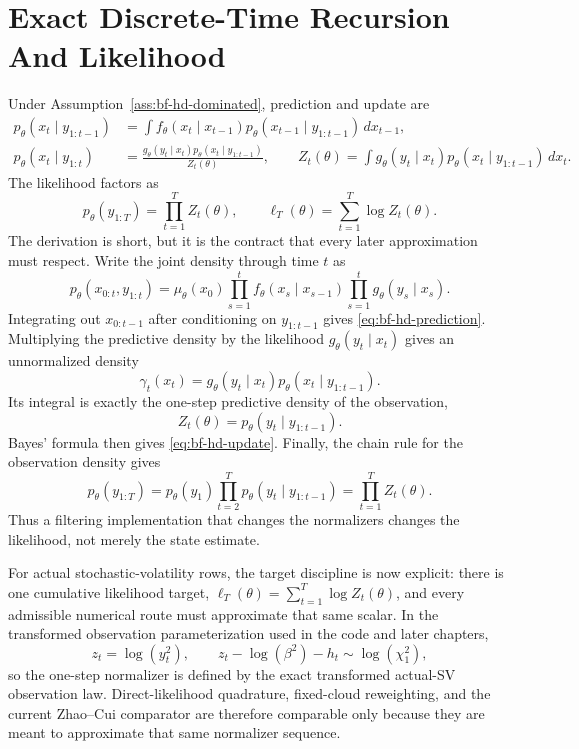 \section{Exact Discrete-Time Recursion And Likelihood}
\label{sec:bf-hd-exact-recursion}

Under Assumption~\ref{ass:bf-hd-dominated}, prediction and update are
\begin{align}
  p_\theta(x_t\mid y_{1:t-1})
    &= \int f_\theta(x_t\mid x_{t-1})
       p_\theta(x_{t-1}\mid y_{1:t-1})\,dx_{t-1},
       \label{eq:bf-hd-prediction}\\
  p_\theta(x_t\mid y_{1:t})
    &= \frac{g_\theta(y_t\mid x_t)p_\theta(x_t\mid y_{1:t-1})}
            {Z_t(\theta)},\qquad
  Z_t(\theta)=\int g_\theta(y_t\mid x_t)
       p_\theta(x_t\mid y_{1:t-1})\,dx_t .
       \label{eq:bf-hd-update}
\end{align}
The likelihood factors as
\begin{equation}
  p_\theta(y_{1:T})=\prod_{t=1}^T Z_t(\theta),\qquad
  \ell_T(\theta)=\sum_{t=1}^T \log Z_t(\theta).
  \label{eq:bf-hd-likelihood-factor}
\end{equation}
The derivation is short, but it is the contract that every later approximation
must respect.  Write the joint density through time \(t\) as
\begin{equation}
  p_\theta(x_{0:t},y_{1:t})
  =
  \mu_\theta(x_0)
  \prod_{s=1}^t f_\theta(x_s\mid x_{s-1})
  \prod_{s=1}^t g_\theta(y_s\mid x_s).
\end{equation}
Integrating out \(x_{0:t-1}\) after conditioning on \(y_{1:t-1}\) gives
\eqref{eq:bf-hd-prediction}.  Multiplying the predictive density by the
likelihood \(g_\theta(y_t\mid x_t)\) gives an unnormalized density
\[
  \gamma_t(x_t)=g_\theta(y_t\mid x_t)
       p_\theta(x_t\mid y_{1:t-1}).
\]
Its integral is exactly the one-step predictive density of the observation,
\[
  Z_t(\theta)=p_\theta(y_t\mid y_{1:t-1}).
\]
Bayes' formula then gives \eqref{eq:bf-hd-update}.  Finally, the chain rule for
the observation density gives
\[
  p_\theta(y_{1:T})
  =p_\theta(y_1)\prod_{t=2}^T p_\theta(y_t\mid y_{1:t-1})
  =\prod_{t=1}^T Z_t(\theta).
\]
Thus a filtering implementation that changes the normalizers changes the
likelihood, not merely the state estimate.

For actual stochastic-volatility rows, the target discipline is now explicit:
there is one cumulative likelihood target,
\(
\ell_T(\theta)=\sum_{t=1}^T\log Z_t(\theta)
\),
and every admissible numerical route must approximate that same scalar.  In the
transformed observation parameterization used in the code and later chapters,
\[
  z_t=\log(y_t^2),
  \qquad
  z_t-\log(\beta^2)-h_t\sim \log(\chi_1^2),
\]
so the one-step normalizer is defined by the exact transformed actual-SV
observation law.  Direct-likelihood quadrature, fixed-cloud reweighting, and the
current Zhao--Cui comparator are therefore comparable only because they are meant
to approximate that same normalizer sequence.

